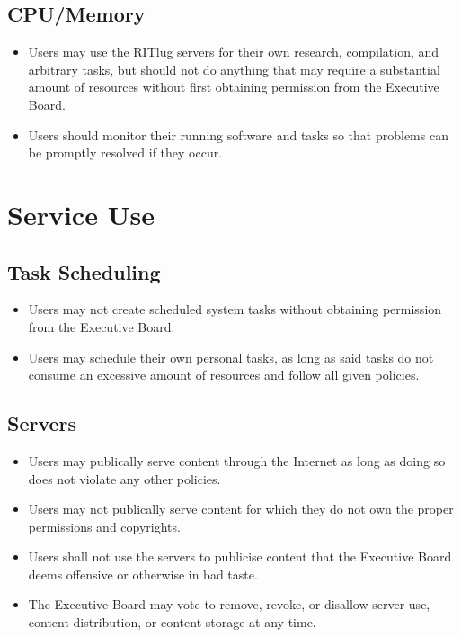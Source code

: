 \subsection{CPU/Memory}
\begin{itemize}
\item Users may use the RITlug servers for their own research, compilation, and arbitrary tasks, but should not do anything that may require a substantial amount of resources without first obtaining permission from the Executive Board.
\item Users should monitor their running software and tasks so that problems can be promptly resolved if they occur.
\end{itemize}

\section{Service Use}

\subsection{Task Scheduling}
\begin{itemize}
\item Users may not create scheduled system tasks without obtaining permission from the Executive Board.
\item Users may schedule their own personal tasks, as long as said tasks do not consume an excessive amount of resources and follow all given policies.
\end{itemize}

\subsection{Servers}
\begin{itemize}
\item Users may publically serve content through the Internet as long as doing so does not violate any other policies.
\item Users may not publically serve content for which they do not own the proper permissions and copyrights.
\item Users shall not use the servers to publicise content that the Executive Board deems offensive or otherwise in bad taste.
\item The Executive Board may vote to remove, revoke, or disallow server use, content distribution, or content storage at any time.
\end{itemize}

